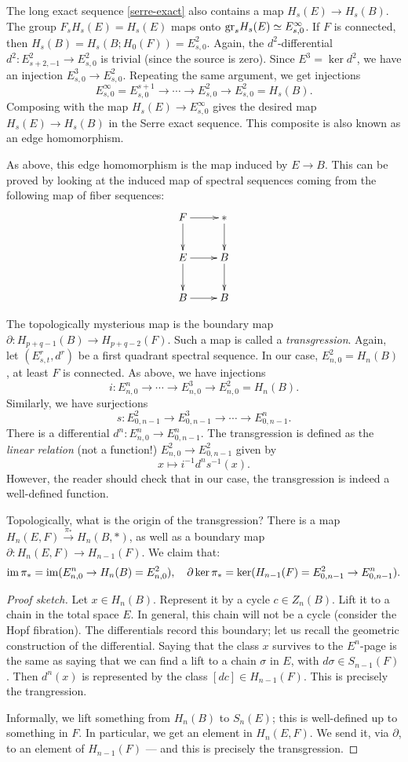 The long exact sequence \eqref{serre-exact} also contains a map $H_s(E)\to
H_s(B)$. The group $F_s H_s(E) = H_s(E)$ maps onto $\mathrm{gr}_s H_s(E) \simeq
E^\infty_{s,0}$. If $F$ is connected, then $H_s(B) = H_s(B;H_0(F)) =
E^2_{s,0}$. Again, the $d^2$-differential $d^2:E^2_{s+2,-1}\to E^2_{s,0}$ is
trivial (since the source is zero). Since $E^3 = \ker d^2$, we have an
injection $E^3_{s,0} \to E^2_{s,0}$. Repeating the same argument, we get
injections
$$E^\infty_{s,0} = E^{s+1}_{s,0}\to \cdots\to E^2_{s,0}\to E^2_{s,0} =
H_s(B).$$
Composing with the map $H_s(E)\to E^\infty_{s,0}$ gives the desired map $H_s(E)
\to H_s(B)$ in the Serre exact sequence. This composite is also known as an
edge homomorphism.

As above, this edge homomorphism is the map induced by $E\to B$. This can be
proved by looking at the induced map of spectral sequences coming from the
following map of fiber sequences:
\begin{equation*}
    \xymatrix{
	F\ar[r]\ar[d] & \ast\ar[d]\\
	E\ar[r]\ar[d] & B\ar[d]\\
	B\ar[r] & B
    }
\end{equation*}

The topologically mysterious map is the boundary map $\partial:H_{p+q-1}(B)\to
H_{p+q-2}(F)$. Such a map is called a \emph{transgression}. Again, let
$(E^r_{s,t},d^r)$ be a first quadrant spectral sequence. In our case,
$E^2_{n,0} = H_n(B)$, at least $F$ is connected. As above, we have injections
$$i:E^n_{n,0} \to \cdots\to E^3_{n,0} \to E^2_{n,0} = H_n(B).$$
Similarly, we have surjections
$$s:E^2_{0,n-1}\to E^3_{0,n-1}\to \cdots\to E^n_{0,n-1}.$$
There is a differential $d^n:E^n_{n,0}\to E^n_{0,n-1}$. The transgression is
defined as the \emph{linear relation} (not a function!) $E^2_{n,0}\to
E^2_{0,n-1}$ given by
$$x\mapsto i^{-1} d^n s^{-1}(x).$$
However, the reader should check that in our case, the transgression is indeed
a well-defined function.

Topologically, what is the origin of the transgression? There is a map
$H_n(E,F)\xrightarrow{\pi_\ast} H_n(B,\ast)$, as well as a boundary map
$\partial : H_n(E,F) \to H_{n-1}(F)$. We claim that:
$$\operatorname{im} \pi_\ast = \operatorname{im}(E^n_{n,0}\to H_n(B) = E^2_{n,0}),\quad
\partial\ker\pi_\ast = \ker(H_{n-1}(F) = E^2_{0,n-1} \to E^n_{0,n-1}).$$
\begin{proof}[Proof sketch]
    Let $x\in H_n(B)$. Represent it by a cycle $c\in Z_n(B)$. Lift it to a
    chain in the total space $E$. In general, this chain will not be a cycle
    (consider the Hopf fibration). The differentials record this boundary; let
    us recall the geometric construction of the differential. Saying that the
    class $x$ survives to the $E^n$-page is the same as saying that we can find
    a lift to a chain $\sigma$ in $E$, with $d\sigma\in S_{n-1}(F)$. Then
    $d^n(x)$ is represented by the class $[dc]\in H_{n-1}(F)$. This is
    precisely the trangression.

    Informally, we lift something from $H_n(B)$ to $S_n(E)$; this is
    well-defined up to something in $F$. In particular, we get an element in
    $H_n(E,F)$. We send it, via $\partial$, to an element of $H_{n-1}(F)$ ---
    and this is precisely the transgression.
\end{proof}
